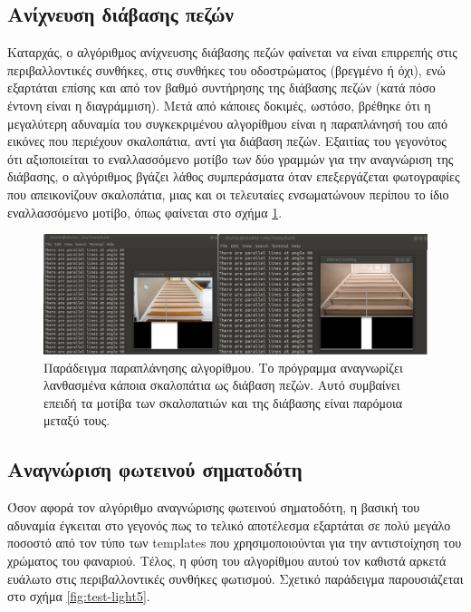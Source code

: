 \subsection{Ανίχνευση διάβασης πεζών}
Καταρχάς, ο αλγόριθμος ανίχνευσης διάβασης πεζών φαίνεται να είναι επιρρεπής στις περιβαλλοντικές συνθήκες, στις συνθήκες του οδοστρώματος (βρεγμένο ή όχι), ενώ εξαρτάται επίσης και από τον βαθμό συντήρησης της διάβασης πεζών (κατά πόσο έντονη είναι η διαγράμμιση). Μετά από κάποιες δοκιμές, ωστόσο, βρέθηκε ότι η μεγαλύτερη αδυναμία του συγκεκριμένου αλγορίθμου είναι η παραπλάνησή του από εικόνες που περιέχουν σκαλοπάτια, αντί για διάβαση πεζών. Εξαιτίας του γεγονότος ότι αξιοποιείται το εναλλασσόμενο μοτίβο των δύο γραμμών για την αναγνώριση της διάβασης, ο αλγόριθμος βγάζει λάθος συμπεράσματα όταν επεξεργάζεται φωτογραφίες που απεικονίζουν σκαλοπάτια, μιας και οι τελευταίες ενσωματώνουν περίπου το ίδιο εναλλασσόμενο μοτίβο, όπως φαίνεται στο σχήμα \ref{fig:test-zebra4}.

\begin{figure}[H]
    \centering
    \includegraphics[width=\textwidth]{images/test_zebra4.png}
    \caption{Παράδειγμα παραπλάνησης αλγορίθμου. Το πρόγραμμα αναγνωρίζει λανθασμένα κάποια σκαλοπάτια ως διάβαση πεζών. Αυτό συμβαίνει επειδή τα μοτίβα των σκαλοπατιών και της διάβασης είναι παρόμοια μεταξύ τους.}
    \label{fig:test-zebra4}
\end{figure}

\subsection{Αναγνώριση φωτεινού σηματοδότη}
Όσον αφορά τον αλγόριθμο αναγνώρισης φωτεινού σηματοδότη, η βασική του αδυναμία έγκειται στο γεγονός πως το τελικό αποτέλεσμα εξαρτάται σε πολύ μεγάλο ποσοστό από τον τύπο των templates που χρησιμοποιούνται για την αντιστοίχηση του χρώματος του φαναριού. Τέλος, η φύση του αλγορίθμου αυτού τον καθιστά αρκετά ευάλωτο στις περιβαλλοντικές συνθήκες φωτισμού. Σχετικό παράδειγμα παρουσιάζεται στο σχήμα \ref{fig:test-light5}.


